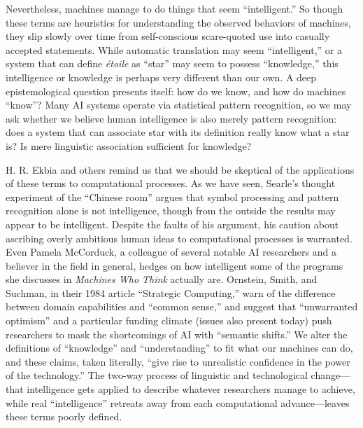 Nevertheless, machines manage to do things that seem ``intelligent.'' So
though these terms are heuristics for understanding the observed
behaviors of machines, they slip slowly over time from self-conscious
scare-quoted use into casually accepted statements. While automatic
translation may seem ``intelligent,'' or a system that can define \emph{\'{e}toile}
as ``star'' may seem to possess ``knowledge,'' this intelligence or
knowledge is perhaps very different than our own. A deep
epistemological question presents itself: how do we know, and how do
machines ``know''? Many AI systems operate via statistical pattern
recognition, so we may ask whether we believe human intelligence is
also merely pattern recognition: does a system that can associate star
with its definition really know what a star is? Is mere linguistic
association sufficient for knowledge?

H. R. Ekbia\cite{???} and others remind us that we should be skeptical of the
applications of these terms to computational processes. As we have
seen, Searle's thought experiment of the ``Chinese room''
argues that symbol processing and pattern recognition alone is not
intelligence, though from the outside the results may appear to be
intelligent. Despite the faults of his argument, his caution
about ascribing overly ambitious human ideas to computational
processes is warranted. Even Pamela McCorduck, a colleague of several
notable AI researchers and a believer in the field in general, hedges
on how intelligent some of the programs she discusses in \emph{Machines Who
Think} actually are. Ornstein, Smith, and Suchman, in their 1984
article ``Strategic Computing,'' warn of the difference between domain
capabilities and ``common sense,'' and suggest that ``unwarranted
optimism'' and a particular funding climate (issues also present today)
push researchers to mask the shortcomings of AI with ``semantic
shifts.''\cite{???} We alter the definitions of ``knowledge'' and ``understanding''
to fit what our machines can do, and these claims, taken literally,
``give rise to unrealistic confidence in the power of the technology.''\cite{???}
The two-way process of linguistic and technological change---that
intelligence gets applied to describe whatever researchers manage to
achieve, while real ``intelligence'' retreats away from each
computational advance---leaves these terms poorly defined.


